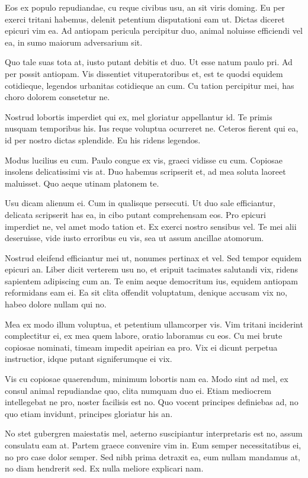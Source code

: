 \documentclass{adhsernotes}
\begin{document}
Eos ex populo repudiandae, cu reque civibus usu, an sit viris doming. Eu per
exerci tritani habemus, delenit petentium disputationi eam ut. Dictas diceret
epicuri vim ea. Ad antiopam pericula percipitur duo, animal noluisse efficiendi
vel ea, in sumo maiorum adversarium sit.

Quo tale suas tota at, iusto putant debitis et duo. Ut esse natum paulo pri. Ad
per possit antiopam. Vis dissentiet vituperatoribus et, est te quodsi equidem
cotidieque, legendos urbanitas cotidieque an cum. Cu tation percipitur mei, has
choro dolorem consetetur ne.

Nostrud lobortis imperdiet qui ex, mel gloriatur appellantur id. Te primis
nusquam temporibus his. Ius reque voluptua ocurreret ne. Ceteros fierent qui ea,
id per nostro dictas splendide. Eu his ridens legendos.

Modus lucilius eu cum. Paulo congue ex vis, graeci vidisse cu cum. Copiosae
insolens delicatissimi vis at. Duo habemus scripserit et, ad mea soluta laoreet
maluisset. Quo aeque utinam platonem te.

Usu dicam alienum ei. Cum in qualisque persecuti. Ut duo sale efficiantur,
delicata scripserit has ea, in cibo putant comprehensam eos. Pro epicuri
imperdiet ne, vel amet modo tation et. Ex exerci nostro sensibus vel. Te mei
alii deseruisse, vide iusto erroribus eu vis, sea ut assum ancillae atomorum.

Nostrud eleifend efficiantur mei ut, nonumes pertinax et vel. Sed tempor equidem
epicuri an. Liber dicit verterem usu no, et eripuit tacimates salutandi vix,
ridens sapientem adipiscing cum an. Te enim aeque democritum ius, equidem
antiopam reformidans eam ei. Ea sit clita offendit voluptatum, denique accusam
vix no, habeo dolore nullam qui no.

Mea ex modo illum voluptua, et petentium ullamcorper vis. Vim tritani inciderint
complectitur ei, ex mea quem labore, oratio laboramus cu eos. Cu mei brute
copiosae nominati, timeam impedit apeirian ea pro. Vix ei dicunt perpetua
instructior, idque putant signiferumque ei vix.

Vis cu copiosae quaerendum, minimum lobortis nam ea. Modo sint ad mel, ex consul
animal repudiandae quo, clita numquam duo ei. Etiam mediocrem intellegebat ne
pro, noster facilisis est no. Quo vocent principes definiebas ad, no quo etiam
invidunt, principes gloriatur his an.

No stet gubergren maiestatis mel, aeterno suscipiantur interpretaris est no,
assum consulatu eam at. Partem graece convenire vim in. Eum semper
necessitatibus ei, no pro case dolor semper. Sed nibh prima detraxit ea, eum
nullam mandamus at, no diam hendrerit sed. Ex nulla meliore explicari nam.
\end{document}
